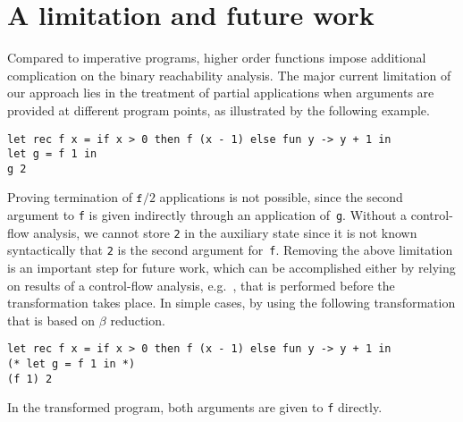 \section{A limitation and future work}
\label{sec:conclusion}

Compared to imperative programs, higher order functions impose
additional complication on the binary reachability analysis.
The major current limitation of our approach lies in the treatment of
partial applications when arguments are provided at different program
points, as illustrated by the following example. 
%
\begin{small}
\begin{verbatim}
let rec f x = if x > 0 then f (x - 1) else fun y -> y + 1 in
let g = f 1 in
g 2
\end{verbatim}
\end{small}
%
Proving termination of $\mathtt{f}/2$ applications is not possible,
since the second argument to \texttt{f} is given indirectly through an
application of~\texttt{g}. 
Without a control-flow analysis, we cannot store \texttt{2} in the
auxiliary state since it is not known syntactically that \texttt{2} is
the second argument for~\texttt{f}.
Removing the above limitation is an important step for future work,
which can be accomplished either by relying on results of a
control-flow analysis, e.g.~\cite{MightPOPL11}, that is performed
before the transformation takes place.
In simple cases, by using the following transformation that is based
on $\beta$ reduction.
%
\begin{small}
\begin{verbatim}
let rec f x = if x > 0 then f (x - 1) else fun y -> y + 1 in
(* let g = f 1 in *)
(f 1) 2
\end{verbatim}
\end{small}
%
In the transformed program, both arguments are given to \texttt{f}
directly.





